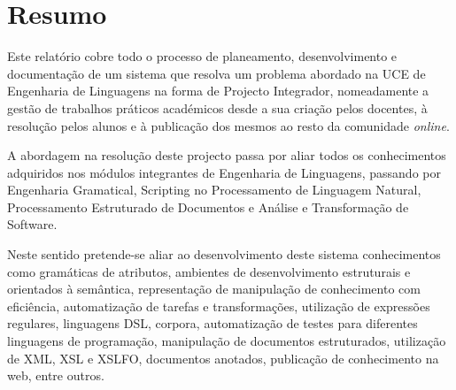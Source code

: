 \section{Resumo}
  Este relatório cobre todo o processo de planeamento, desenvolvimento e
  documentação de um sistema que resolva um problema abordado na UCE de
  Engenharia de Linguagens na forma de Projecto Integrador, nomeadamente
  a gestão de trabalhos práticos académicos desde a sua criação pelos docentes, à resolução pelos alunos
  e à publicação dos mesmos ao resto da comunidade \textit{online}.

  A abordagem na resolução deste projecto passa por aliar todos os conhecimentos
  adquiridos nos módulos integrantes de Engenharia de Linguagens, passando por
 Engenharia Gramatical, Scripting no Processamento de Linguagem Natural, Processamento
 Estruturado de Documentos e Análise e Transformação de Software.

 Neste sentido pretende-se aliar ao desenvolvimento deste sistema conhecimentos
 como gramáticas de atributos, ambientes de desenvolvimento estruturais e
 orientados à semântica, representação de manipulação de conhecimento com
 eficiência, automatização de tarefas e transformações, utilização de expressões
 regulares, linguagens DSL, corpora, automatização de testes para diferentes
 linguagens de programação, manipulação de documentos estruturados, utilização
 de XML, XSL e XSLFO, documentos anotados, publicação de conhecimento na web,
 entre outros.
